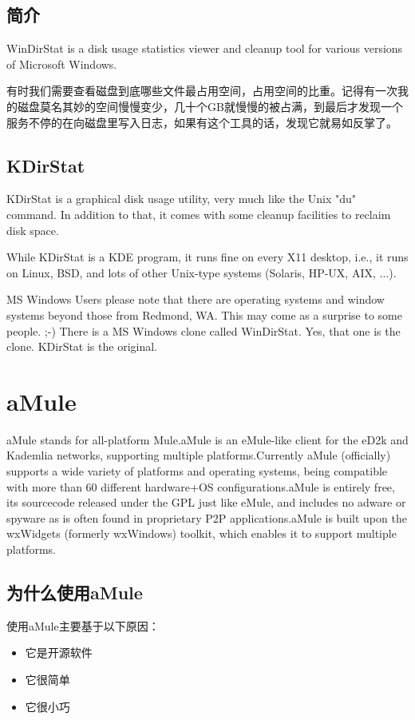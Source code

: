 \documentclass[paper=a4,fontsize=11pt]{article}
\begin{document}
	\subsection{简介}
	WinDirStat is a disk usage statistics viewer and cleanup tool for various versions of Microsoft Windows.
	
	有时我们需要查看磁盘到底哪些文件最占用空间，占用空间的比重。记得有一次我的磁盘莫名其妙的空间慢慢变少，几十个GB就慢慢的被占满，到最后才发现一个服务不停的在向磁盘里写入日志，如果有这个工具的话，发现它就易如反掌了。
	
	\subsection{KDirStat}
	KDirStat is a graphical disk usage utility, very much like the Unix "du" command. In addition to that, it comes with some cleanup facilities to reclaim disk space.
	
	While KDirStat is a KDE program, it runs fine on every X11 desktop, i.e., it runs on Linux, BSD, and lots of other Unix-type systems (Solaris, HP-UX, AIX, ...).
	
	MS Windows Users please note that there are operating systems and window systems beyond those from Redmond, WA. This may come as a surprise to some people. ;-) There is a MS Windows clone called WinDirStat. Yes, that one is the clone. KDirStat is the original.
			
	\section{aMule}
	aMule stands for all-platform Mule.aMule is an eMule-like client for the eD2k and Kademlia networks, supporting multiple platforms.Currently aMule (officially) supports a wide variety of platforms and operating systems, being compatible with more than 60 different hardware+OS configurations.aMule is entirely free, its sourcecode released under the GPL just like eMule, and includes no adware or spyware as is often found in proprietary P2P applications.aMule is built upon the wxWidgets (formerly wxWindows) toolkit, which enables it to support multiple platforms.
	\subsection{为什么使用aMule}
	使用aMule主要基于以下原因：
	\begin{itemize}
		\item{它是开源软件}
		\item{它很简单}
		\item{它很小巧}
	\end{itemize}
	
\end{document}
